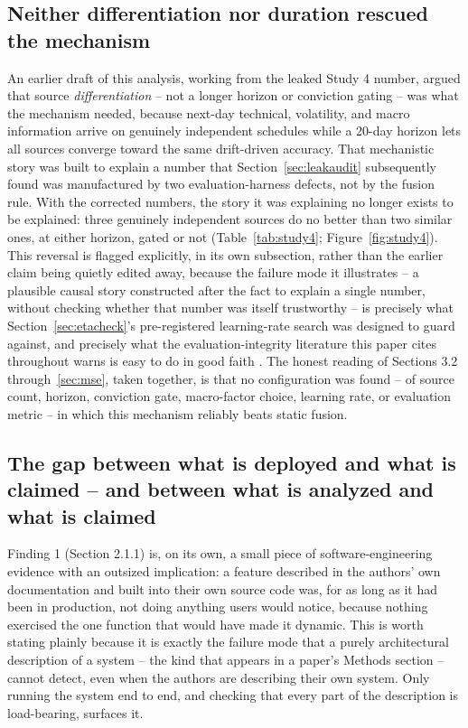 \documentclass[10pt,a4paper,twocolumn]{article}
\begin{document}
\subsection{Neither differentiation nor duration rescued the mechanism}

An earlier draft of this analysis, working from the leaked Study 4 number, argued that source \emph{differentiation} -- not a longer horizon or conviction gating -- was what the mechanism needed, because next-day technical, volatility, and macro information arrive on genuinely independent schedules while a 20-day horizon lets all sources converge toward the same drift-driven accuracy. That mechanistic story was built to explain a number that Section~\ref{sec:leakaudit} subsequently found was manufactured by two evaluation-harness defects, not by the fusion rule. With the corrected numbers, the story it was explaining no longer exists to be explained: three genuinely independent sources do no better than two similar ones, at either horizon, gated or not (Table~\ref{tab:study4}; Figure~\ref{fig:study4}). This reversal is flagged explicitly, in its own subsection, rather than the earlier claim being quietly edited away, because the failure mode it illustrates -- a plausible causal story constructed after the fact to explain a single number, without checking whether that number was itself trustworthy -- is precisely what Section~\ref{sec:etacheck}'s pre-registered learning-rate search was designed to guard against, and precisely what the evaluation-integrity literature this paper cites throughout warns is easy to do in good faith \cite{bailey2014,harvey2016,lopezdeprado2018}. The honest reading of Sections 3.2 through~\ref{sec:mse}, taken together, is that no configuration was found -- of source count, horizon, conviction gate, macro-factor choice, learning rate, or evaluation metric -- in which this mechanism reliably beats static fusion.

\subsection{The gap between what is deployed and what is claimed -- and between what is analyzed and what is claimed}

Finding 1 (Section 2.1.1) is, on its own, a small piece of software-engineering evidence with an outsized implication: a feature described in the authors' own documentation and built into their own source code was, for as long as it had been in production, not doing anything users would notice, because nothing exercised the one function that would have made it dynamic. This is worth stating plainly because it is exactly the failure mode that a purely architectural description of a system -- the kind that appears in a paper's Methods section -- cannot detect, even when the authors are describing their own system. Only running the system end to end, and checking that every part of the description is load-bearing, surfaces it.
\end{document}
